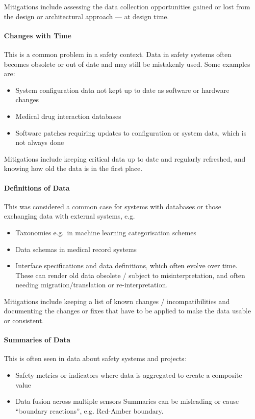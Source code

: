 Mitigations include assessing the data collection opportunities gained or lost from the design or architectural approach --- at design time.

\paragraph{Changes with Time}\label{bkm:dark7}
This is a common problem in a safety context. Data in safety systems often becomes obsolete or out of date and may still be mistakenly used. Some examples are:
\begin{itemize}
\item System configuration data not kept up to date as software or hardware changes
  \item Medical drug interaction databases
  \item Software patches requiring updates to configuration or system data, which is not always done
\end{itemize}

Mitigations include keeping critical data up to date and regularly refreshed, and knowing how old the data is in the first place.

\paragraph{Definitions of Data}\label{bkm:dark8}
This was considered a common case for systems with databases or those exchanging data with external systems, e.g.
\begin{itemize}
\item Taxonomies e.g.\ in machine learning categorisation schemes
  \item Data schemas in medical record systems 
  \item Interface specifications and data definitions, which often evolve over time. These can render old data obsolete / subject to misinterpretation, and often needing migration/translation or re-interpretation.
\end{itemize}

Mitigations include keeping a list of known changes / incompatibilities and documenting the changes or fixes that have to be applied to make the data usable or consistent.

\paragraph{Summaries of Data}\label{bkm:dark9}
This is often seen in data about safety systems and projects:
\begin{itemize}
\item Safety metrics or indicators where data is aggregated to create a composite value
  \item Data fusion across multiple sensors
Summaries can be misleading or cause “boundary reactions”, e.g. Red-Amber boundary.
\end{itemize}


